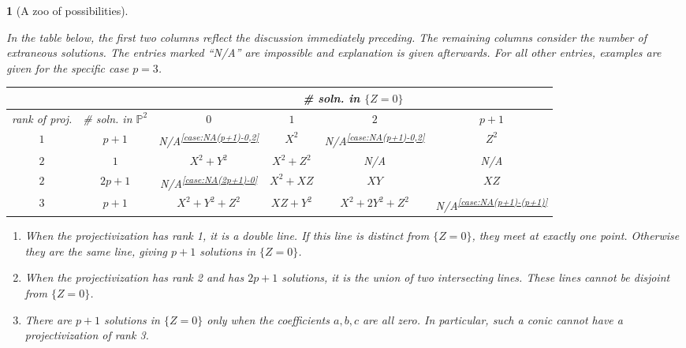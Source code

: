 \documentclass[10pt,a4paper]{amsart}
\numberwithin{equation}{section}
\numberwithin{figure}{section}
\numberwithin{table}{section}
\theoremstyle{definition}
\theoremstyle{plain}
\newtheorem{example}[thm]{\protect\examplename}
\theoremstyle{remark}
\theoremstyle{plain}
\theoremstyle{definition}
\theoremstyle{plain}
\theoremstyle{plain}
\providecommand{\examplename}{Example}
\begin{document}
	\begin{example}[A zoo of possibilities]
		\label{exa:all-possibilities}
		
		In the table below, the first two columns reflect the discussion
		immediately preceding. The remaining columns consider the number of extraneous
		solutions. The entries marked ``N/A'' are impossible and explanation is given
		afterwards. For all other entries, examples are given for the specific case
		$p=3$.  
		\begin{center} %
			\begin{tabular}{c|c|c|c|c|c}  \multicolumn{2}{c|}{} &
				\multicolumn{4}{c}{\# soln. in $\{Z=0\}$}  \\ \hline
				rank of proj. & \# soln. in $\mathbb{P}^2$ & $0$ & $1$ & $2$ & $p + 1$\\
				\hline \hline
				$1$ & $p+1$ & \emph{N/A}\textsuperscript{\ref{case:NA(p+1)-0,2}} & $X^2$ & \emph{N/A}\textsuperscript{\ref{case:NA(p+1)-0,2}} & $Z^2$ \\
				\hline
				$2$ & $1$ & $X^2 + Y^2$ & $X^2 + Z^2$ & \emph{N/A} & \emph{N/A} \\
				\hline
				$2$ &	$2p+1$ & \emph{N/A}\textsuperscript{\ref{case:NA(2p+1)-0}} & $X^2 + XZ$ & $XY$ & $XZ$ \\
				\hline
				$3$ & $p+1$ & $X^2 + Y^2 + Z^2$ & $XZ+Y^2$ & $X^2 + 2Y^2 + Z^2$ & \emph{N/A}\textsuperscript{\ref{case:NA(p+1)-(p+1)}} \\
				\hline
			\end{tabular}
		\end{center} 
		\begin{enumerate}
			\item\label{case:NA(p+1)-0,2} When the projectivization has rank 1, it is a double line. If this
			line is distinct from $\{Z = 0\}$, they meet at exactly one point. 
			Otherwise they are the same line, giving $p+1$ solutions in $\{Z=0\}$. 
			\item\label{case:NA(2p+1)-0} When the projectivization has rank 2 and has $2p + 1$ solutions, it
			is the union of two intersecting lines. These lines cannot be disjoint 
			from $\{Z=0\}$.
			\item\label{case:NA(p+1)-(p+1)} There are $p+1$ solutions in $\{Z = 0\}$ only when the 
			coefficients $a,b,c$ are all zero. In particular, such a conic cannot 
			have a projectivization of rank 3.
		\end{enumerate} 
	\end{example}
	
\end{document}
